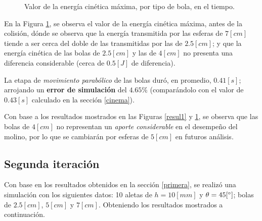 \begin{figure}[h!]
\centering
{}
\caption{Valor de la energ\'ia cin\'etica m\'axima, por tipo de bola, en el tiempo.}
\label{res1}
\end{figure}

\noindent
\justify

En la Figura \ref{res1}, se observa el valor de la energ\'ia cin\'etica m\'axima, antes de la colisi\'on, d\'onde se observa que la energ\'ia transmitida por las esferas de $7 [cm]$ tiende a ser cerca del doble de las transmitidas por las de $2.5 [cm]$; y que la energ\'ia cin\'etica de las bolas de $2.5 [cm]$ y las de $4 [cm]$ no presenta una diferencia considerable (cerca de $0.5 [J]$ de diferencia).

\noindent
\justify

La etapa de \textit{movimiento parab\'olico} de las bolas dur\'o, en promedio, $0.41 [s]$; arrojando un \textbf{error de simulaci\'on} del $4.65 \%$ (compar\'andolo con el valor de $0.43 [s]$ calculado en la secci\'on \ref{cinema}).

\noindent
\justify

Con base a los resultados mostrados en las Figuras \ref{resul1} y \ref{res1}, se observa que las bolas de $4 [cm]$ no representan un \textit{aporte considerable} en el desempe\~no del molino, por lo que se cambiar\'an por esferas de $5 [cm]$ en futuros an\'alisis.  

\subsection{Segunda iteraci\'on} \label{segunda}

\noindent
\justify

Con base en los resultados obtenidos en la secci\'on \ref{primera}, se realiz\'o una simulaci\'on con los siguientes datos: 10 aletas de $h = 10 [mm]$ y $\theta = 45 [\degree ]$; bolas de $2.5 [cm]$, $5 [cm]$ y $7 [cm]$. Obteniendo los resultados mostrados a continuaci\'on.

